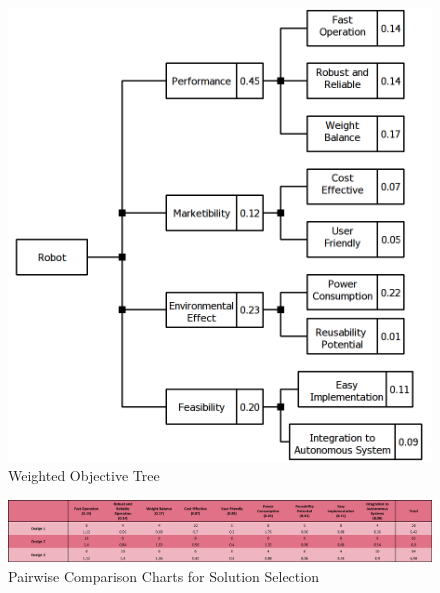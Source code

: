 \documentclass[a4paper,12pt]{article}
\begin{document}
	\begin{figure}[H]
		\centering
		\includegraphics[width=\textwidth,height=\textheight,keepaspectratio]{objective-tree/objective-tree} 
		\caption{\label{fig:product_tree}Weighted Objective Tree}
	\end{figure}
	
	\begin{figure}[H]
		\centering
		\includegraphics[width=\textwidth,height=\textheight,keepaspectratio]{images/soln_selection} 
		\caption{\label{fig:soln_selection}Pairwise Comparison Charts for Solution Selection}
	\end{figure}




\end{document}
